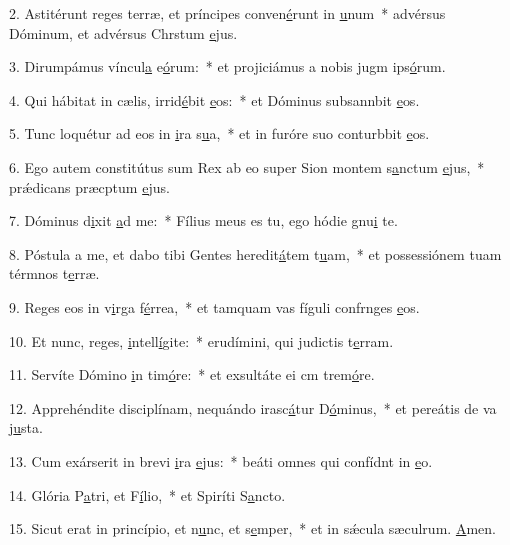2. Astitérunt reges terræ, et príncipes conven\uline{é}runt in \uline{u}num~* advérsus Dóminum, et advérsus Chrstum \uline{e}jus.\par 
3. Dirumpámus víncul\uline{a} e\uline{ó}rum:~* et projiciámus a nobis jugm ips\uline{ó}rum.\par 
4. Qui hábitat in cælis, irrid\uline{é}bit \uline{e}os:~* et Dóminus subsannbit \uline{e}os.\par 
5. Tunc loquétur ad eos in \uline{i}ra s\uline{u}a,~* et in furóre suo conturbbit \uline{e}os.\par 
6. Ego autem constitútus sum Rex ab eo super Sion montem s\uline{a}nctum \uline{e}jus,~* prǽdicans præcptum \uline{e}jus.\par 
7. Dóminus d\uline{i}xit \uline{a}d me:~* Fílius meus es tu, ego hódie gnu\uline{i} te.\par 
8. Póstula a me, et dabo tibi Gentes heredit\uline{á}tem t\uline{u}am,~* et possessiónem tuam térmnos t\uline{e}rræ.\par 
9. Reges eos in v\uline{i}rga f\uline{é}rrea,~* et tamquam vas fíguli confrnges \uline{e}os.\par 
10. Et nunc, reges, \uline{i}ntell\uline{í}gite:~* erudímini, qui judictis t\uline{e}rram.\par 
11. Servíte Dómino \uline{i}n tim\uline{ó}re:~* et exsultáte ei cm trem\uline{ó}re.\par 
12. Apprehéndite disciplínam, nequándo irasc\uline{á}tur D\uline{ó}minus,~* et pereátis de va j\uline{u}sta.\par 
13. Cum exárserit in brevi \uline{i}ra \uline{e}jus:~* beáti omnes qui confídnt in \uline{e}o.\par 
14. Glória P\uline{a}tri, et F\uline{í}lio,~* et Spiríti S\uline{a}ncto.\par 
15. Sicut erat in princípio, et n\uline{u}nc, et s\uline{e}mper,~* et in sǽcula sæculrum. \uline{A}men.\par 
